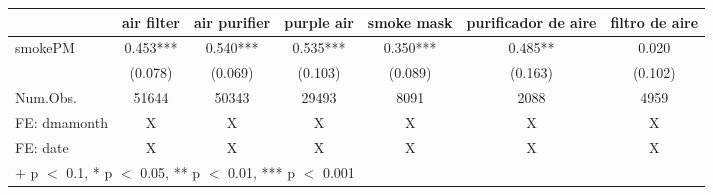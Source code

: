 \begin{table}
\centering
\begin{tabular}[t]{lcccccc}
\toprule
  & air filter & air purifier & purple air & smoke mask & purificador de aire & filtro de aire\\
\midrule
smokePM & 0.453*** & 0.540*** & 0.535*** & 0.350*** & 0.485** & 0.020\\
 & (0.078) & (0.069) & (0.103) & (0.089) & (0.163) & (0.102)\\
\midrule
Num.Obs. & 51644 & 50343 & 29493 & 8091 & 2088 & 4959\\
FE: dmamonth & X & X & X & X & X & X\\
FE: date & X & X & X & X & X & X\\
\bottomrule
\multicolumn{7}{l}{\rule{0pt}{1em}+ p $<$ 0.1, * p $<$ 0.05, ** p $<$ 0.01, *** p $<$ 0.001}\\
\end{tabular}
\end{table}
